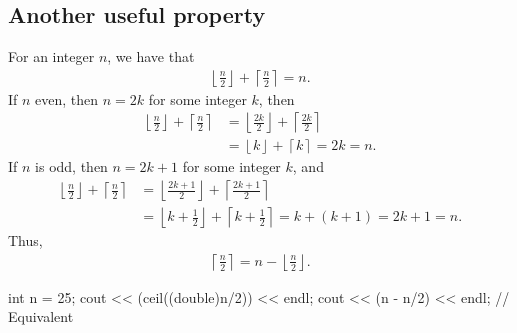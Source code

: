 \documentclass{report}
\begin{document}
    \subsection{Another useful property}
    \bigbreak \noindent 
    For an integer $n$, we have that
    \begin{align*}
        \left\lfloor \frac{n}{2} \right\rfloor + \left\lceil \frac{n}{2} \right\rceil = n
    .\end{align*}
    \bigbreak \noindent 
    If $n$ even, then $n = 2k$ for some integer $k$, then
    \begin{align*}
        \left\lfloor \frac{n}{2} \right\rfloor + \left\lceil \frac{n}{2} \right\rceil &= \left\lfloor \frac{2k}{2} \right\rfloor + \left\lceil \frac{2k}{2} \right\rceil \\
        &= \left\lfloor k \right\rfloor + \left\lceil k \right\rceil = 2k = n
    .\end{align*}
    If $n$ is odd, then $ n = 2k+1$ for some integer $k$, and 
    \begin{align*}
        \left\lfloor \frac{n}{2} \right\rfloor + \left\lceil \frac{n}{2} \right\rceil &= \left\lfloor \frac{2k+1}{2} \right\rfloor + \left\lceil \frac{2k+1}{2} \right\rceil \\
                                                                                      &= \left\lfloor k + \frac{1}{2} \right\rfloor + \left\lceil k + \frac{1}{2} \right\rceil = k + (k+1) = 2k + 1  =n
    .\end{align*}
    Thus, 
    \begin{align*}
        \left\lceil \frac{n}{2} \right\rceil = n - \left\lfloor \frac{n}{2} \right\rfloor
    .\end{align*}
    \bigbreak \noindent 
    \begin{cppcode}
    int n = 25;
    cout << (ceil((double)n/2)) << endl;
    cout << (n - n/2) << endl; // Equivalent
    \end{cppcode}




\pagebreak 
{}
\bigbreak \noindent 
\end{document}
